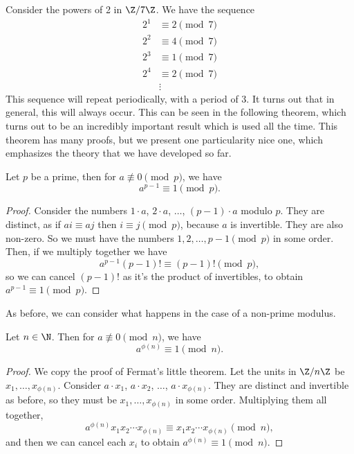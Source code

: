 \documentclass[a4paper]{scrreprt}
\begin{document}
Consider the powers of 2 in $\Z/7\Z$. We have the sequence
\begin{align*}
	2^1 &\equiv 2 \pmod{7}\\
	2^2 &\equiv 4 \pmod{7}\\
	2^3 &\equiv 1 \pmod{7}\\
	2^4 &\equiv 2 \pmod{7}\\
		&\vdots
\end{align*}
This sequence will repeat periodically, with a period of 3.
It turns out that in general, this will always occur. This can be seen in the following theorem, which turns out to be an incredibly important result which is used all the time. This theorem has many proofs, but we present one particularity nice one, which emphasizes the theory that we have developed so far.

\begin{theorem}
	Let $p$ be a prime, then for $a \not\equiv 0 \pmod{p}$, we have 
	$$a^{p - 1} \equiv 1 \pmod{p}.$$
\end{theorem}
\begin{proof}
	Consider the numbers $1 \cdot a$, $2 \cdot a$, $\dots$, $(p - 1) \cdot a$ modulo $p$. They are distinct, as if $a i \equiv aj$ then $i \equiv j \pmod{p}$, because $a$ is invertible. They are also non-zero. So we must have the numbers $1, 2, \dots, p - 1 \pmod{p}$ in some order. Then, if we multiply together we have
	$$
	a^{p - 1} (p - 1)! \equiv (p - 1)! \pmod{p},
	$$
	so we can cancel $(p - 1)!$ as it's the product of invertibles, to obtain $a^{p - 1} \equiv 1 \pmod{p}$.
\end{proof}

As before, we can consider what happens in the case of a non-prime modulus.

\begin{theorem}
	Let $n \in \N$. Then for $a \not \equiv 0 \pmod{n}$, we have
	$$
	a^{\phi(n)} \equiv 1 \pmod{n}.
	$$
\end{theorem}
\begin{proof}
	We copy the proof of Fermat's little theorem. Let the units in $\Z/n\Z$ be $x_1, \dots, x_{\phi(n)}$. Consider $a \cdot x_1$, $a \cdot x_2$, $\dots$, $a \cdot x_{\phi(n)}$. They are distinct and invertible as before, so they must be $x_1, \dots, x_{\phi(n)}$ in some order. Multiplying them all together,
	$$
	a^{\phi(n)} x_1 x_2 \cdots x_{\phi(n)} \equiv x_1 x_2 \cdots x_{\phi(n)} \pmod{n},
	$$
	and then we can cancel each $x_i$ to obtain $a^{\phi(n)} \equiv 1 \pmod{n}$.
\end{proof}
\end{document}
